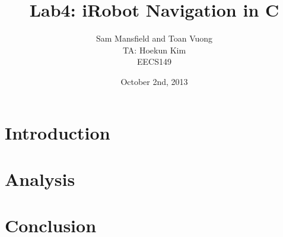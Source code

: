\documentclass[10pt,titlepage]{article}
\begin{document}
  \title{Lab4: iRobot Navigation in C}
  \author{Sam Mansfield and Toan Vuong\\
          TA: Hoekun Kim\\ 
          EECS149}
  \date{October 2nd, 2013}
  \maketitle

  \section{Introduction}

  \section{Analysis}
   

  \section{Conclusion}
\end{document}

